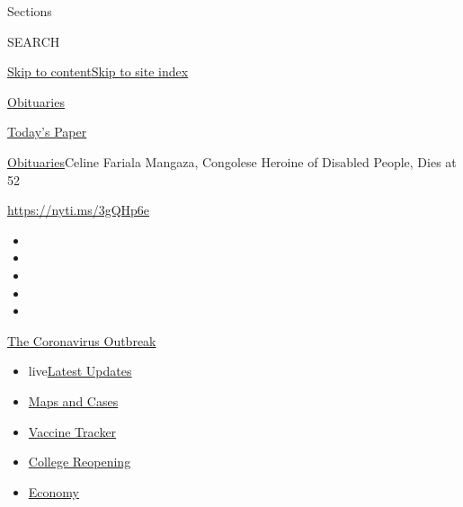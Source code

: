 Sections

SEARCH

\protect\hyperlink{site-content}{Skip to
content}\protect\hyperlink{site-index}{Skip to site index}

\href{https://www.nytimes3xbfgragh.onion/section/obituaries}{Obituaries}

\href{https://myaccount.nytimes3xbfgragh.onion/auth/login?response_type=cookie\&client_id=vi}{}

\href{https://www.nytimes3xbfgragh.onion/section/todayspaper}{Today's
Paper}

\href{/section/obituaries}{Obituaries}\textbar{}Celine Fariala Mangaza,
Congolese Heroine of Disabled People, Dies at 52

\url{https://nyti.ms/3gQHp6e}

\begin{itemize}
\item
\item
\item
\item
\item
\end{itemize}

\href{https://www.nytimes3xbfgragh.onion/news-event/coronavirus?action=click\&pgtype=Article\&state=default\&region=TOP_BANNER\&context=storylines_menu}{The
Coronavirus Outbreak}

\begin{itemize}
\tightlist
\item
  live\href{https://www.nytimes3xbfgragh.onion/2020/08/04/world/coronavirus-covid-19.html?action=click\&pgtype=Article\&state=default\&region=TOP_BANNER\&context=storylines_menu}{Latest
  Updates}
\item
  \href{https://www.nytimes3xbfgragh.onion/interactive/2020/us/coronavirus-us-cases.html?action=click\&pgtype=Article\&state=default\&region=TOP_BANNER\&context=storylines_menu}{Maps
  and Cases}
\item
  \href{https://www.nytimes3xbfgragh.onion/interactive/2020/science/coronavirus-vaccine-tracker.html?action=click\&pgtype=Article\&state=default\&region=TOP_BANNER\&context=storylines_menu}{Vaccine
  Tracker}
\item
  \href{https://www.nytimes3xbfgragh.onion/2020/08/02/us/covid-college-reopening.html?action=click\&pgtype=Article\&state=default\&region=TOP_BANNER\&context=storylines_menu}{College
  Reopening}
\item
  \href{https://www.nytimes3xbfgragh.onion/live/2020/08/03/business/stock-market-today-coronavirus?action=click\&pgtype=Article\&state=default\&region=TOP_BANNER\&context=storylines_menu}{Economy}
\end{itemize}

